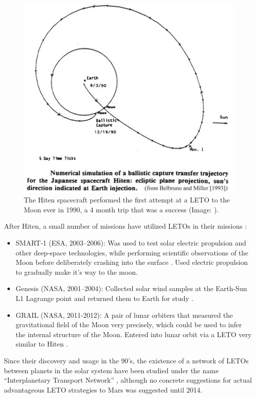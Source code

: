 \begin{figure}[ht]
    \centering
    \includegraphics[width=0.60\linewidth]{fig/hiten.png}
    \caption{The Hiten spacecraft performed the first attempt at a LETO to the Moon ever in 1990, a 4 month trip that was a success (Image: \cite{Belbuno1990}).}
    \label{fig:hiten}
\end{figure}

After Hiten, a small number of missions have utilized LETOs in their missions \cite{Wikipedia}:
\begin{itemize}
	\item SMART-1 (ESA, 2003--2006): Was used to test solar electric propulsion and other deep-space technologies, while performing scientific observations of the Moon before deliberately crashing into the surface \cite{ESA}. Used electric propulsion to gradually make it's way to the moon.
    \item Genesis (NASA, 2001--2004): Collected solar wind samples at the Earth-Sun L1 Lagrange point and returned them to Earth for study \cite{NASAa}.
    \item GRAIL (NASA, 2011-2012): A pair of lunar orbiters that measured the gravitational field of the Moon very precisely, which could be used to infer the internal structure of the Moon. Entered into lunar orbit via a LETO very similar to Hiten \cite{NASA2013,Wikipediaa}. 
\end{itemize}

Since their discovery and usage in the 90's, the existence of a network of LETOs between planets in the solar system have been studied under the name ``Interplanetary Transport Network'' \cite{Ross2006}, although no concrete suggestions for actual advantageous LETO strategies to Mars was suggested until 2014.

